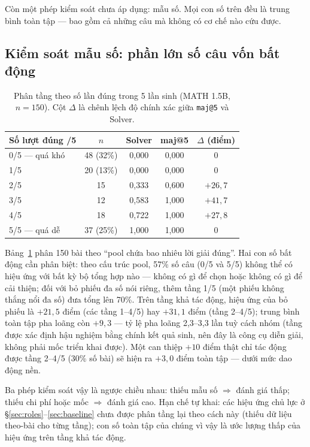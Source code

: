 Còn một phép kiểm soát chưa áp dụng: mẫu số. Mọi con số trên đều là trung bình toàn tập --- bao gồm cả những câu mà không có cơ chế nào cứu được.

\subsection{Kiểm soát mẫu số: phần lớn số câu vốn bất động}\label{sec:denominator}

\begin{table}[h]\centering\small
\begin{tabular}{@{}l c c c c@{}}
\toprule
Số lượt đúng /5 & $n$ & Solver & maj@5 & $\Delta$ (điểm)\\
\midrule
0/5 --- quá khó & 48 (32\%) & 0,000 & 0,000 & 0\\
1/5 & 20 (13\%) & 0,000 & 0,000 & 0\\
2/5 & 15 & 0,333 & 0,600 & $+26{,}7$\\
3/5 & 12 & 0,583 & 1,000 & $+41{,}7$\\
4/5 & 18 & 0,722 & 1,000 & $+27{,}8$\\
5/5 --- quá dễ & 37 (25\%) & 1,000 & 1,000 & 0\\
\bottomrule
\end{tabular}
\caption{Phân tầng theo số lần đúng trong 5 lần sinh (MATH 1.5B, $n=150$). Cột $\Delta$ là chênh lệch độ chính xác giữa \texttt{maj@5} và Solver.}
\label{tab:strata}
\end{table}

Bảng~\ref{tab:strata} phân 150 bài theo ``pool chứa bao nhiêu lời giải đúng''. Hai con số bất động cần phân biệt: theo cấu trúc pool, 57\% số câu (0/5 và 5/5) không thể có hiệu ứng với bất kỳ bộ tổng hợp nào --- không có gì để chọn hoặc không có gì để cải thiện; đối với bỏ phiếu đa số nói riêng, thêm tầng 1/5 (một phiếu không thắng nổi đa số) đưa tổng lên 70\%. Trên tầng khả tác động, hiệu ứng của bỏ phiếu là $+21{,}5$ điểm (các tầng 1--4/5) hay $+31{,}1$ điểm (tầng 2--4/5); trung bình toàn tập pha loãng còn $+9{,}3$ --- tỷ lệ pha loãng 2,3--3,3 lần tuỳ cách nhóm (tầng được xác định hậu nghiệm bằng chính kết quả sinh, nên đây là công cụ diễn giải, không phải mốc triển khai được). Một can thiệp $+10$ điểm thật chỉ tác động được tầng 2--4/5 (30\% số bài) sẽ hiện ra $+3{,}0$ điểm toàn tập --- dưới mức dao động nền.

Ba phép kiểm soát vậy là ngược chiều nhau: thiếu mẫu số $\Rightarrow$ đánh giá thấp; thiếu chi phí hoặc mốc $\Rightarrow$ đánh giá cao. Hạn chế tự khai: các hiệu ứng chủ lực ở \S\ref{sec:roles}--\ref{sec:baseline} chưa được phân tầng lại theo cách này (thiếu dữ liệu theo-bài cho từng tầng); con số toàn tập của chúng vì vậy là ước lượng thấp của hiệu ứng trên tầng khả tác động.


